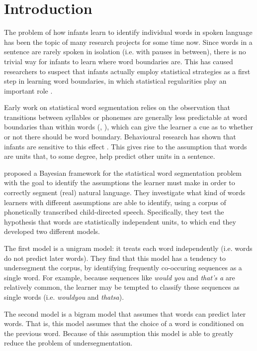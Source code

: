 \section{Introduction}
The problem of how infants learn to identify individual words in spoken language has been the topic of many research projects for some time now. Since words in a sentence are rarely spoken in isolation (i.e. with pauses in between), there is no trivial way for infants to learn where word boundaries are. This has caused researchers to suspect that infants actually employ statistical strategies as a first step in learning word boundaries, in which statistical regularities play an important role \cite{thiessen2003cues}.

Early work on statistical word segmentation relies on the observation that transitions between syllables or phonemes are generally less predictable at word boundaries than within words (\cite{harris1970phoneme}, \cite{saffran1996statistical}), which can give the learner a cue as to whether or not there should be word boundary. Behavioural research has shown that infants are sensitive to this effect \cite{saffran1996statistical} \cite{aslin1998computation}. This gives rise to the assumption that words are units that, to some degree, help predict other units in a sentence.

\cite{Goldwater200921} proposed a Bayesian framework for the statistical word segmentation problem with the goal to identify the assumptions the learner must make in order to correctly segment (real) natural language. They investigate what kind of words learners with different assumptions are able to identify, using a corpus of phonetically transcribed child-directed speech. Specifically, they test the hypothesis that words are statistically independent units, to which end they developed two different models.

The first model is a unigram model: it treats each word independently (i.e. words do not predict later words). They find that this model has a tendency to undersegment the corpus, by identifying frequently co-occuring sequences as a single word. For example, because sequences like \textit{would you} and \textit{that's a} are relatively common, the learner may be tempted to classify these sequences as single words (i.e. \textit{wouldyou} and \textit{thatsa}).

The second model is a bigram model that assumes that words can predict later words. That is, this model assumes that the choice of a word is conditioned on the previous word. Because of this assumption this model is able to greatly reduce the problem of undersegmentation.

